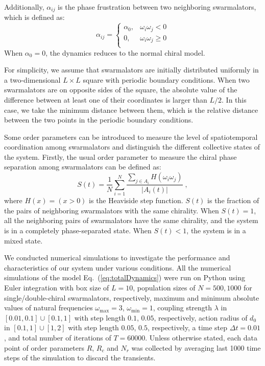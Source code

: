 \documentclass{article}
\begin{document}
Additionally, $\alpha_{ij}$ is the phase frustration between two neighboring swarmalators, which is defined as:
\begin{equation}
    \alpha _{ij}=\begin{cases}
        \alpha _0,&		\omega _i\omega _j<0\\
        0,&		\omega _i\omega _j\geqslant 0\\
    \end{cases}
\end{equation}
When $\alpha_0=0$, the dynamics reduces to the normal chiral model.

For simplicity, we assume that swarmalators are initially distributed uniformly in a two-dimensional $L\times L$ square with periodic boundary conditions. When two swarmalators are on opposite sides of the square, the absolute value of the difference between at least one of their coordinates is larger than $L/2$. In this case, we take the minimum distance between them, which is the relative distance between the two points in the periodic boundary conditions.

Some order parameters can be introduced to measure the level of spatiotemporal coordination among swarmalators and distinguish the different collective states of the system. Firstly, the usual order parameter to measure the chiral phase separation among swarmalators can be defined as:
\begin{equation}
    S\left( t \right) =\frac{1}{N}\sum_{i=1}^N{\frac{\sum_{j\in A_i}{H\left( \omega _i\omega _j \right)}}{\left| A_i\left( t \right) \right|}}\;,
\end{equation}
where $H\left( x \right) =\left( x>0 \right)$ is the Heaviside step function. $S\left( t \right)$ is the fraction of the pairs of neighboring swarmalators with the same chirality. When $S\left( t \right)=1$, all the neighboring pairs of swarmalators have the same chirality, and the system is in a completely phase-separated state. When $S\left( t \right)< 1$, the system is in a mixed state.

We conducted numerical simulations to investigate the performance and characteristics of our system under various conditions.
All the numerical simulations of the model Eq.~(\ref{eq:totalDynamics}) were run on Python using Euler integration with box size of $L=10$, population sizes of $N=500, 1000$ for single/double-chiral swarmalators, respectively, maximum and minimum absolute values of natural frequencies $\omega_{\max}=3$, $\omega_{\min}=1$, coupling strength $\lambda$ in $\left[ 0.01, 0.1 \right] \cup \left[ 0.1, 1 \right]$ with step length $0.1$, $0.05$, respectively, action radius of $d_0$ in $\left[ 0.1, 1 \right] \cup \left[ 1, 2 \right]$ with step length $0.05$, $0.5$, respectively, a time step $\Delta t=0.01$, and total number of iterations of $T=60000$. Unless otherwise stated, each data point of order parameters $R$, $R_c$ and $N_r$ was collected by averaging last 1000 time steps of the simulation to discard the transients.
\end{document}
